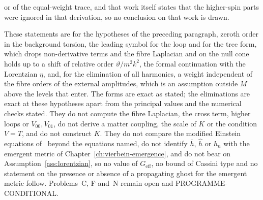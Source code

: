 or of the equal-weight trace, and that work itself states that the higher-spin parts were ignored in that derivation, so no conclusion on that work is drawn.

These statements are for the hypotheses of the preceding paragraph, zeroth order in the background torsion, the leading symbol for the loop and for the tree form, which drops non-derivative terms and the fibre Laplacian and on the null cone holds up to a shift of relative order \(\vartheta/m^2k^2\), the formal continuation with the Lorentzian \(\eta\), and, for the elimination of all harmonics, a weight independent of the fibre orders of the external amplitudes, which is an assumption outside \(M\) above the levels that enter. The forms are exact as stated; the eliminations are exact at these hypotheses apart from the principal values and the numerical checks stated. They do not compute the fibre Laplacian, the cross term, higher loops or \(V_{00},V_{01}\), do not derive a matter coupling, the scale of \(K\) or the condition \(V=T\), and do not construct \(K\). They do not compare the modified Einstein equations of~\cite{KumarSteinacker2023,Steinacker2026} beyond the equations named, do not identify \(\bar h\), \(\hat h\) or \(h_n\) with the emergent metric of Chapter~\ref{ch:vierbein-emergence}, and do not bear on Assumption~\ref{ass:lorentzian}, so no value of \(G_{\mathrm{eff}}\), no bound of Cassini type and no statement on the presence or absence of a propagating ghost for the emergent metric follow. Problems~C, F and~N remain open and PROGRAMME-CONDITIONAL.
